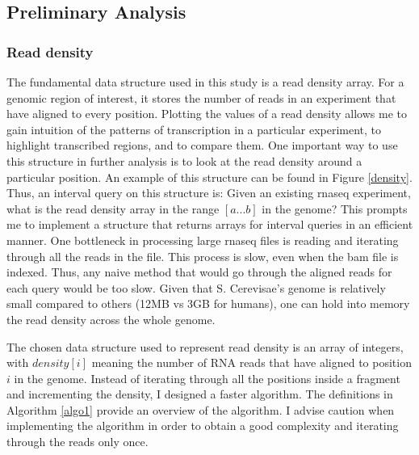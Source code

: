 \documentclass[12pt]{article}
\begin{document}


\subsection{Preliminary Analysis}

\subsubsection{Read density}
\label{density_section}
The fundamental data structure used in this study is a read density array. For a genomic region of interest, it stores the number of reads in an experiment that have aligned to every position. Plotting the values of a read density allows me to gain intuition of the patterns of transcription in a particular experiment, to highlight transcribed regions, and to compare them. One important way to use this structure in further analysis is to look at the read density around a particular position. An example of this structure can be found in Figure \ref{density}. Thus, an interval query on this structure is: Given an existing \acrshort{rnaseq} experiment, what is the read density array in the range $[a...b]$ in the genome? 
This prompts me to implement a structure that returns arrays for interval queries in an efficient manner. One bottleneck in processing large \acrshort{rnaseq} files is reading and iterating through all the reads in the file. This process is slow, even when the bam file is indexed. Thus, any naive method that would go through the aligned reads for each query would be too slow. Given that S. Cerevisae's genome is relatively small compared to others (12MB vs 3GB for humans), one can hold into memory the read density across the whole genome.

The chosen data structure used to represent read density is an array of integers, with $density[i]$ meaning the number of RNA reads that have aligned to position $i$ in the genome. Instead of iterating through all the positions inside a fragment and incrementing the density, I designed a faster algorithm. The definitions in Algorithm \ref{algo1} provide an overview of the algorithm. I advise caution when implementing the algorithm in order to obtain a good complexity and iterating through the reads only once.




\end{document}
